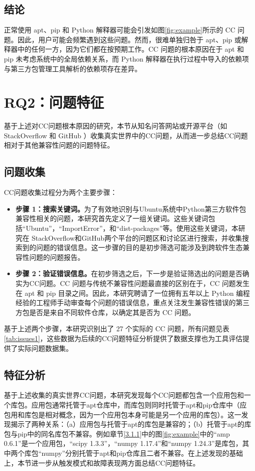 \subsection{结论}
正常使用 apt、pip 和 Python 解释器可能会引发如图\ref{fig:example}所示的 CC 问题。因此，用户可能会频繁遇到这些问题。然而，很难单独归咎于 apt、pip 或解释器中的任何一方，因为它们都在按预期工作。CC 问题的根本原因在于 apt 和 pip 未考虑系统中的全局依赖关系，而 Python 解释器在执行过程中导入的依赖项与第三方包管理工具解析的依赖项存在差异。


\section{RQ2：问题特征}\label{3.3}
基于上述对CC问题根本原因的研究，本节从知名问答网站或开源平台（如 StackOverflow  和 GitHub ）收集真实世界中的CC问题，从而进一步总结CC问题相对于其他兼容性问题的问题特征。

\subsection{问题收集}\label{3.3.1}
CC问题收集过程分为两个主要步骤：
\begin{itemize}
	\item \textbf{步骤 1：搜索关键词。}为了有效地识别与Ubuntu系统中Python第三方软件包兼容性相关的问题，本研究首先定义了一组关键词。这些关键词包括“Ubuntu”，“ImportError”，和“dist-packages”等。使用这些关键词，本研究在 StackOverflow和GitHub两个平台的问题区和讨论区进行搜索，并收集搜索到的问题的错误信息。这一步骤的目的是初步筛选可能涉及到跨软件生态兼容性问题的问题报告。
	\item \textbf{步骤 2：验证错误信息。}在初步筛选之后，下一步是验证筛选出的问题是否确实为CC问题。CC 问题与传统不兼容性问题最直接的区别在于，CC 问题发生在 apt 和 pip 目录之间。因此，本研究聘请了一位拥有五年以上 Python 编程经验的工程师手动审查每个问题的错误信息，重点关注发生兼容性错误的第三方包是否是来自不同软件仓库，以确定其是否为 CC 问题。
\end{itemize}


基于上述两个步骤，本研究识别出了 27 个实际的 CC 问题，所有问题见表\ref{tab:issues1}，这些数据为后续的CC问题特征分析提供了数据支撑也为工具评估提供了实际问题数据集。


\subsection{特征分析}\label{3.3.2}
基于上述收集的真实世界CC问题，本研究发现每个CC问题都包含一个应用包和一个库包。应用包通常托管于apt仓库中，而库包则同时托管于apt和pip仓库中（应包用和库包是相对概念，因为一个应用包本身可能是另一个应用的库包）。这一发现揭示了两种关系：（a）应用包与托管于apt的库包是兼容的；（b）托管于apt的库包与pip中的同名库包不兼容。例如章节\ref{3.1.1}中的图\ref{fig:example}中的“amp 0.6.1”是一个应用包，“scipy 1.3.3”，“numpy 1.17.4”和“numpy 1.24.3”是库包，其中两个库包“numpy”分别托管于apt和pip仓库且二者不兼容。在上述发现的基础上，本节进一步从触发模式和故障表现两方面总结CC问题特征。

